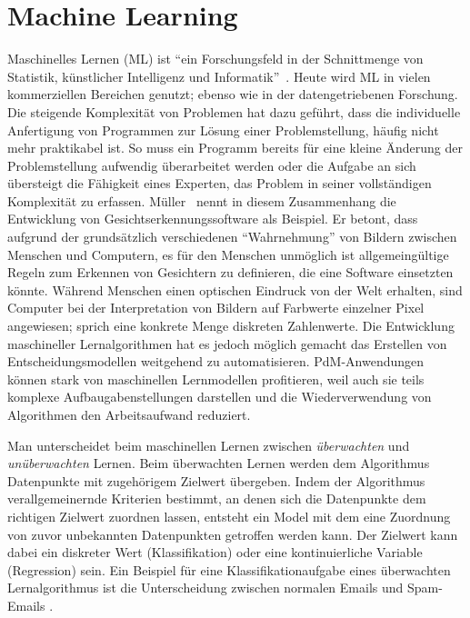 \chapter{Machine Learning}
\label{ch:machine_learning}
Maschinelles Lernen (ML) ist \enquote{ein Forschungsfeld in der Schnittmenge von Statistik, künstlicher Intelligenz und Informatik}~\cite[S.~1]{Muller.2017}. Heute wird ML in vielen kommerziellen Bereichen genutzt; ebenso wie in der datengetriebenen Forschung. Die steigende Komplexität von Problemen hat dazu geführt, dass die individuelle Anfertigung von Programmen zur Lösung einer Problemstellung, häufig nicht mehr praktikabel ist. So muss ein Programm bereits für eine kleine Änderung der Problemstellung aufwendig überarbeitet werden oder die Aufgabe an sich übersteigt die Fähigkeit eines Experten, das Problem in seiner vollständigen Komplexität zu erfassen. Müller~\cite{Muller.2017} nennt in diesem Zusammenhang die Entwicklung von Gesichtserkennungssoftware als Beispiel. Er betont, dass aufgrund der grundsätzlich verschiedenen \enquote{Wahrnehmung} von Bildern zwischen Menschen und Computern, es für den Menschen unmöglich ist allgemeingültige Regeln zum Erkennen von Gesichtern zu definieren, die eine Software einsetzten könnte. Während Menschen einen optischen Eindruck von der Welt erhalten, sind Computer bei der Interpretation von Bildern auf Farbwerte einzelner Pixel angewiesen; sprich eine konkrete Menge diskreten Zahlenwerte. Die Entwicklung maschineller Lernalgorithmen hat es jedoch möglich gemacht das Erstellen von Entscheidungsmodellen weitgehend zu automatisieren. PdM-Anwendungen können stark von maschinellen Lernmodellen profitieren, weil auch sie teils komplexe Aufbaugabenstellungen darstellen und die Wiederverwendung von Algorithmen den Arbeitsaufwand reduziert.

Man unterscheidet beim maschinellen Lernen zwischen \textit{überwachten} und \textit{unüberwachten} Lernen. Beim überwachten Lernen werden dem Algorithmus Datenpunkte mit zugehörigem Zielwert übergeben. Indem der Algorithmus verallgemeinernde Kriterien bestimmt, an denen sich die Datenpunkte dem richtigen Zielwert zuordnen lassen, entsteht ein Model mit dem eine Zuordnung von zuvor unbekannten Datenpunkten getroffen werden kann. Der Zielwert kann dabei ein diskreter Wert (Klassifikation) oder eine kontinuierliche Variable (Regression) sein. Ein Beispiel für eine Klassifikationaufgabe eines überwachten Lernalgorithmus ist die Unterscheidung zwischen normalen Emails und Spam-Emails \cite[S.~2]{Muller.2017}.

